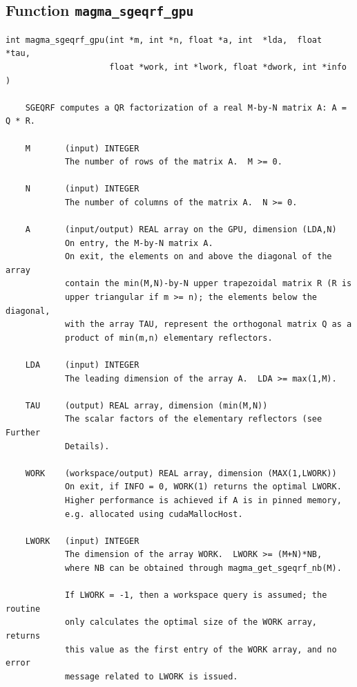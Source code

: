 \documentclass[10pt]{book}
\begin{document}

\newpage
\subsection{Function {\tt {\bf magma\_sgeqrf\_gpu}}}
\begin{verbatim}
int magma_sgeqrf_gpu(int *m, int *n, float *a, int  *lda,  float  *tau,
                     float *work, int *lwork, float *dwork, int *info )
  
    SGEQRF computes a QR factorization of a real M-by-N matrix A: A = Q * R.   

    M       (input) INTEGER   
            The number of rows of the matrix A.  M >= 0.   

    N       (input) INTEGER   
            The number of columns of the matrix A.  N >= 0.   

    A       (input/output) REAL array on the GPU, dimension (LDA,N)   
            On entry, the M-by-N matrix A.   
            On exit, the elements on and above the diagonal of the array   
            contain the min(M,N)-by-N upper trapezoidal matrix R (R is   
            upper triangular if m >= n); the elements below the diagonal,   
            with the array TAU, represent the orthogonal matrix Q as a   
            product of min(m,n) elementary reflectors.

    LDA     (input) INTEGER   
            The leading dimension of the array A.  LDA >= max(1,M).   

    TAU     (output) REAL array, dimension (min(M,N))   
            The scalar factors of the elementary reflectors (see Further   
            Details).   

    WORK    (workspace/output) REAL array, dimension (MAX(1,LWORK))   
            On exit, if INFO = 0, WORK(1) returns the optimal LWORK.   
            Higher performance is achieved if A is in pinned memory, 
            e.g. allocated using cudaMallocHost.

    LWORK   (input) INTEGER   
            The dimension of the array WORK.  LWORK >= (M+N)*NB,   
            where NB can be obtained through magma_get_sgeqrf_nb(M).

            If LWORK = -1, then a workspace query is assumed; the routine   
            only calculates the optimal size of the WORK array, returns   
            this value as the first entry of the WORK array, and no error   
            message related to LWORK is issued.   


\end{verbatim}
\end{document}
